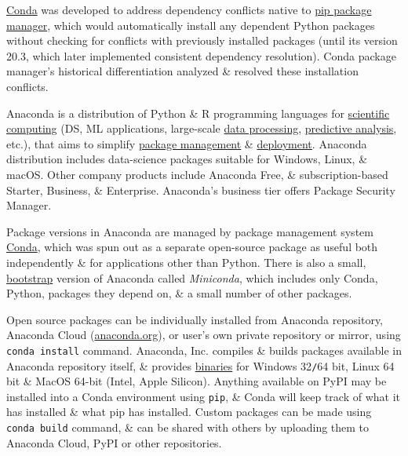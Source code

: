 \documentclass{article}
\begin{document}
\href{https://en.wikipedia.org/wiki/Conda_(package_manager)}{Conda} was developed to address dependency conflicts native to \href{https://en.wikipedia.org/wiki/Pip_(package_manager)}{pip package manager}, which would automatically install any dependent Python packages without checking for conflicts with previously installed packages (until its version 20.3, which later implemented consistent dependency resolution). Conda package manager's historical differentiation analyzed \& resolved these installation conflicts.

Anaconda is a distribution of Python \& R programming languages for \href{https://en.wikipedia.org/wiki/Scientific_computing}{scientific computing} (DS, ML applications, large-scale \href{https://en.wikipedia.org/wiki/Data_processing}{data processing}, \href{https://en.wikipedia.org/wiki/Predictive_analytics}{predictive analysis}, etc.), that aims to simplify \href{https://en.wikipedia.org/wiki/Package_management}{package management} \& \href{https://en.wikipedia.org/wiki/Deployment_environment}{deployment}. Anaconda distribution includes data-science packages suitable for Windows, Linux, \& macOS. Other company products include Anaconda Free, \& subscription-based Starter, Business, \& Enterprise. Anaconda's business tier offers Package Security Manager.

Package versions in Anaconda are managed by package management system \href{https://en.wikipedia.org/wiki/Conda_(package_manager)}{Conda}, which was spun out as a separate open-source package as useful both independently \& for applications other than Python. There is also a small, \href{https://en.wikipedia.org/wiki/Bootstrapping}{bootstrap} version of Anaconda called {\it Miniconda}, which includes only Conda, Python, packages they depend on, \& a small number of other packages.

Open source packages can be individually installed from Anaconda repository, Anaconda Cloud (\url{anaconda.org}), or user's own private repository or mirror, using {\tt conda install} command. Anaconda, Inc. compiles \& builds packages available in Anaconda repository itself, \& provides \href{https://en.wikipedia.org/wiki/Binary_file}{binaries} for Windows 32{\tt/}64 bit, Linux 64 bit \& MacOS 64-bit (Intel, Apple Silicon). Anything available on PyPI may be installed into a Conda environment using {\tt pip}, \& Conda will keep track of what it has installed \& what pip has installed. Custom packages can be made using {\tt conda build} command, \& can be shared with others by uploading them to Anaconda Cloud, PyPI or other repositories.
\end{document}
